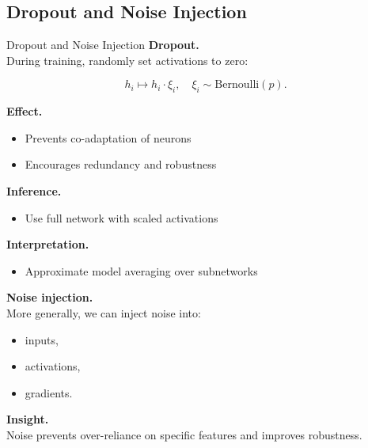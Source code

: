 \documentclass[aspectratio=169,11pt]{beamer}
\begin{document}
\subsection{Dropout and Noise Injection}
\begin{frame}[t,allowframebreaks]{Dropout and Noise Injection}
\small
\textbf{Dropout.}\\ During training, randomly set activations to zero:

\[
h_i \mapsto h_i \cdot \xi_i, \quad \xi_i \sim \text{Bernoulli}(p).
\]

\textbf{Effect.}\\ \begin{itemize}
    \item Prevents co-adaptation of neurons
    \item Encourages redundancy and robustness
\end{itemize}

\textbf{Inference.}\\ \begin{itemize}
    \item Use full network with scaled activations
\end{itemize}

\textbf{Interpretation.}\\ \begin{itemize}
    \item Approximate model averaging over subnetworks
\end{itemize}

\textbf{Noise injection.}\\ More generally, we can inject noise into:

\begin{itemize}
    \item inputs,
    \item activations,
    \item gradients.
\end{itemize}

\textbf{Insight.}\\ Noise prevents over-reliance on specific features and improves robustness.
\end{frame}
\end{document}
